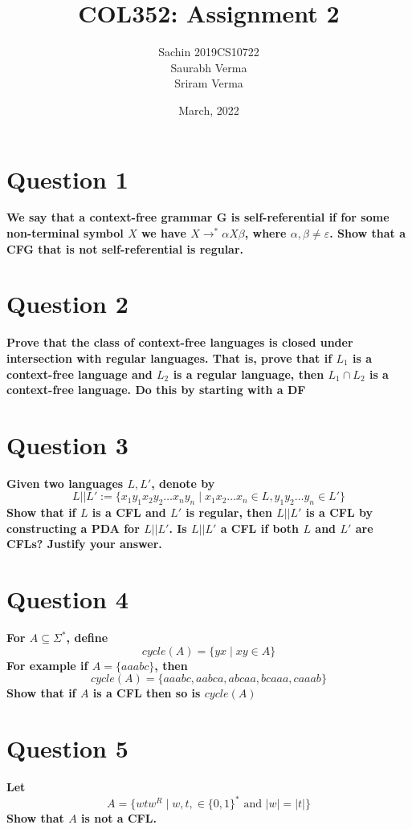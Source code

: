\documentclass{article}
\title{COL352: Assignment 2}
\author{Sachin 2019CS10722 \\
        Saurabh Verma \\
        Sriram Verma}
\date{March, 2022}
\begin{document}
\maketitle


\section{Question 1}
\textbf{We say that a context-free grammar G is self-referential if for some non-terminal symbol $X$ we have $X \to^* \alpha X \beta$, where $\alpha, \beta \neq \varepsilon$. Show that a CFG that is not self-referential is regular.}



\pagebreak


\section{Question 2}
\textbf{Prove that the class of context-free languages is closed under intersection with regular languages. That is, prove that if $L_1$ is a context-free language and $L_2$ is a regular language, then $L_1 \cap L_2$
is a context-free language. Do this by starting with a DF}



\pagebreak


\section{Question 3}
\textbf{Given two languages $L, L'$, denote by 
$$L||L' := \{x_1y_1x_2y_2 \dots x_ny_n \mid x_1x_2 \dots x_n \in L, y_1y_2\dots y_n \in L'\}$$
Show that if $L$ is a CFL and $L'$ is regular, then $L || L'$ is a CFL by constructing a PDA for $L || L'$. Is $L || L'$ a CFL if both $L$ and $L'$ are CFLs? Justify your answer.}


\pagebreak


\section{Question 4}
\textbf{For $A \subseteq \Sigma^*$, define 
$$cycle(A) = \{yx \mid xy \in A\}$$
For example if $A = \{aaabc\}$, then 
$$cycle(A) = \{aaabc, aabca, abcaa, bcaaa, caaab\}$$
Show that if $A$ is a CFL then so is $cycle(A)$}




\pagebreak

\section{Question 5}
\textbf{Let $$A = \{wtw^R\mid w,t, \in \{0,1\}^* \text{ \ and \ } |w| = |t|\}$$ Show that $A$ is not a CFL. }
\end{document}
